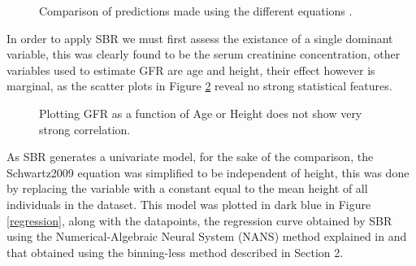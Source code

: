 \documentclass[10pt,final]{siamltex}
\begin{document}
\begin{figure}[ht]
  \centering
  \caption{Comparison of predictions made using the different equations \cite{gfr}.}
  \label{equations}
\end{figure}

In order to apply SBR we must first assess the existance of a single dominant variable, this was clearly found to be the serum creatinine concentration, other variables used to estimate GFR are age and height, their effect however is marginal, as the scatter plots in Figure \ref{recessive} reveal no strong statistical features.

\begin{figure}[ht]
  \centering
  \caption{Plotting GFR as a function of Age or Height does not show very strong correlation.}
  \label{recessive}
\end{figure}

As SBR generates a univariate model, for the sake of the comparison, the Schwartz2009 equation was simplified to be independent of height, this was done by replacing the variable with a constant equal to the mean height of all individuals in the dataset. This model was plotted in dark blue in Figure \ref{regression}, along with the datapoints, the regression curve obtained by SBR using the Numerical-Algebraic Neural System (NANS) method explained in \cite{fiori} and that obtained using the binning-less method described in Section 2.
\end{document}
